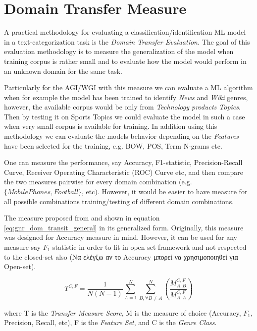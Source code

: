 \section{Domain Transfer Measure}\label{chap:eval_methods:sec:domain_transfer_measure}

A practical methodology for evaluating a classification/identification ML model in a text-categorization task is the \textit{Domain Transfer Evaluation}. The goal of this evaluation methodology is to measure the generalization of the model when training corpus is rather small and to evaluate how the model would perform in an unknown domain for the same task. 

Particularly for the AGI/WGI with this measure we can evaluate a ML algorithm when for example the model has been trained to identify \textit{News} and \textit{Wiki} genres, however, the available corpus would be only from \textit{Technology products Topics}. Then by testing it on {Sports Topics} we could evaluate the model in such a case when very small corpus is available for training. In addition using this methodology we can evaluate the models behavior depending on the \textit{Features} have been selected for the training, e.g. BOW, POS, Term N-grams etc. 

One can measure the performance, say Accuracy, F1-statistic, Precision-Recall Curve,  Receiver Operating Characteristic (ROC) Curve etc, and then compare the two measures pairwise for every domain combination (e.g. $\{Mobile Phones, Football\}$, etc). However, it would be easier to have measure for all possible combinations training/testing of different domain combinations. 

The measure proposed from \parencite{finn2006learning} and shown in equation \ref{eq:gnr_dom_transit_general} in its generalized form. Originally, this measure was designed for Accuracy measure in mind. However, it can be used for any measure say $F_{1}$-statistic in order to fit in open-set framework and not respected to the closed-set also (Να ελέγξω αν το Accuracy μπορεί να χρησιμοποιηθεί για Open-set). 

\begin{equation} \label{chap:eval_methods:eq:office_doc_ensemble}
	T^{C,F} = \frac{1}{N(N-1)} \sum_{A=1}^{N} \sum_{B, \forall B \neq A}^{N} \left(  \frac{M^{C,F}_{A,B}}{M^{C,F}_{A,A}} \right)
	\end{equation}

	\noindent	
where T is the \textit{Transfer Measure Score}, M is the measure of choice (Accuracy, $F_1$, Precision, Recall, etc), F is the \textit{Feature Set}, and C is the \textit{Genre Class}. 
























